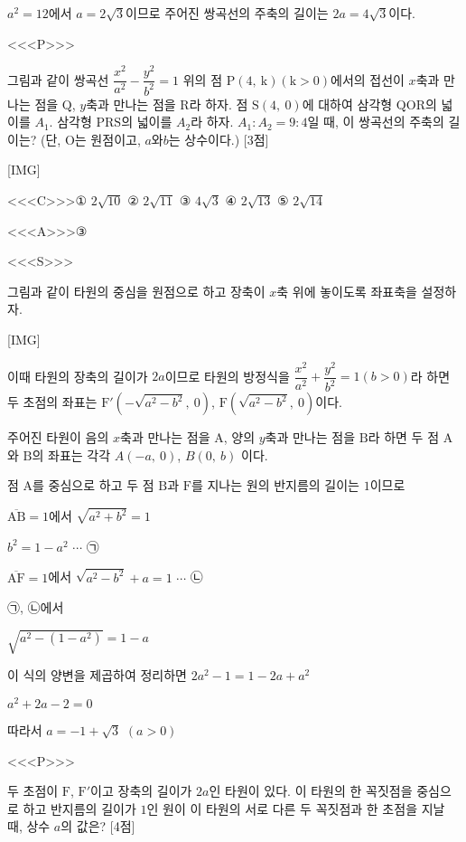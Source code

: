 \documentclass{oblivoir}
\begin{document}
$a^{2}=12$에서 $a=2\sqrt{3}$이므로 주어진 쌍곡선의 주축의 길이는 $2a=4\sqrt{3}$이다.

<<<P>>>

그림과 같이 쌍곡선 $\dfrac{x^{2}}{a^{2}}-\dfrac{y^{2}}{b^{2}}=1$ 위의 점 $\mathrm{P}(4,\:\mathrm{k})(\mathrm{k}>0)$에서의 접선이 $x$축과 만나는 점을 $\mathrm{Q}$, $y$축과 만나는 점을 $\mathrm{R}$라 하자. 점 $\mathrm{S}(4,\: 0)$에 대하여 삼각형 $\mathrm{QOR}$의 넓이를 $A_{1}$. 삼각형 $\mathrm{PRS}$의 넓이를 $A_{2}$라 하자. $A_{1}:A_{2}=9:4$일 때, 이 쌍곡선의 주축의 길이는? (단, $\mathrm{O}$는 원점이고, $a$와$b$는 상수이다.) [3점]

[IMG]

<<<C>>>① $2\sqrt{10}$ ② $2\sqrt{11}$ ③ $4\sqrt{3}$ ④ $2\sqrt{13}$ ⑤ $2\sqrt{14}$

<<<A>>>③

<<<S>>>

그림과 같이 타원의 중심을 원점으로 하고 장축이 $x$축 위에 놓이도록 좌표축을 설정하자.

[IMG]

이때 타원의 장축의 길이가 $2a$이므로 타원의 방정식을 $\dfrac{x^{2}}{a^{2}}+\dfrac{y^{2}}{b^{2}}=1$$(b>0)$라 하면 두 초점의 좌표는 $\mathrm{F}'(-\sqrt{a^{2}-b^{2}},\: 0)$, $\mathrm{F}(\sqrt{a^{2}-b^{2}},\: 0)$이다.

주어진 타원이 음의 $x$축과 만나는 점을 $\mathrm{A}$, 양의 $y$축과 만나는 점을 $\mathrm{B}$라 하면 두 점 $\mathrm{A}$와 $\mathrm{B}$의 좌표는 각각 $A(-a,\:0)$, $B(0,\: b)$ 이다.

점 $\mathrm{A}$를 중심으로 하고 두 점 $\mathrm{B}$과 $\mathrm{F}$를 지나는 원의 반지름의 길이는  $1$이므로

$\overline{\mathrm{AB}}=1$에서 $\sqrt{a^{2}+b^{2}}=1$

$b^{2}=1-a^{2}$ $\cdots$ ㉠

$\overline{\mathrm{AF}}=1$에서 $\sqrt{a^{2}-b^{2}}+a=1$ $\cdots$ ㉡

㉠, ㉡에서

$\sqrt{a^{2}-(1-a^{2})}=1-a$

이 식의 양변을 제곱하여 정리하면 $2a^{2}-1=1-2a+a^{2}$

$a^{2}+2a-2=0$

따라서 $a=-1+\sqrt{3}$ $(a>0)$

<<<P>>>

두 초점이 $\mathrm{F}$, $\mathrm{F}'$이고 장축의 길이가  $2a$인 타원이 있다. 이 타원의 한 꼭짓점을 중심으로 하고 반지름의 길이가 $1$인 원이 이 타원의 서로 다른 두 꼭짓점과 한 초점을 지날 때, 상수 $a$의 값은? [4점]
\end{document}
